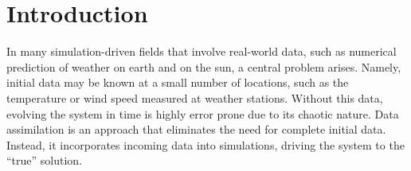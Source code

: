 \documentclass[12pt]{amsart}
\theoremstyle{plain}
\theoremstyle{definition}
\theoremstyle{remark}
\numberwithin{equation}{section} %
\numberwithin{figure}{section}   %
\begin{document}
\maketitle
\section{Introduction}\label{secInt}
\noindent
In many simulation-driven fields that involve real-world data, such as numerical prediction of weather on earth and on the sun, a central problem arises. Namely, initial data may be known at a small number of locations, such as the temperature or wind speed measured at weather stations. Without this data, evolving the system in time is highly error prone due to its chaotic nature. Data assimilation is an approach that eliminates the need for complete initial data. Instead, it incorporates incoming data into simulations, driving the system to the ``true'' solution.
\end{document}

